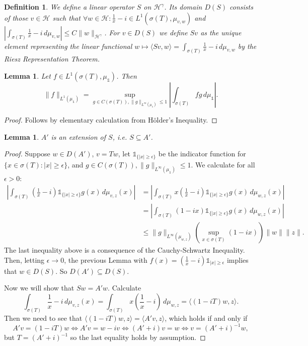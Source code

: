 \documentclass[12pt,oneside]{report}
\newtheorem{lem}[thm]{Lemma}
\newtheorem{defn}[thm]{Definition}
\begin{document}
\begin{defn}
    We define a linear operator $S$ on $\mathscr{H}^{\gamma}$. Its domain $D(S)$ consists of those $v \in \mathscr{H}$ such that $\forall w \in \mathscr{H}: \frac{1}{x} - i \in L^{1}(\sigma(T),\mu_{v,w})$ and $|\int _{\sigma(T)} \frac{1}{x} - i \, d\mu_{v,w}| \leq C\|w\|_{\mathscr{H}^{\gamma}}$. For $v \in D(S)$ we define $Sv$ as the unique element representing the linear functional $w \mapsto \langle Sv, w \rangle = \int _{\sigma(T)} \frac{1}{x} - i \, d\mu_{v,w}$ by the Riesz Representation Theorem.
\end{defn}

\begin{lem}
    Let $f \in L^{1}(\sigma(T), \mu_{\mathds{1}})$. Then
    $$\|f\|_{L^{1}(\mu_{\mathds{1}})} = \sup_{g \in C(\sigma(T)), \|g\|_{L^{\infty}(\mu_{\mathds{1}})}\leq 1} \left|\int _{\sigma(T)} fg \, d\mu_{\mathds{1}}\right|.$$
\end{lem}
\begin{proof}
    Follows by elementary calculation from Hölder's Inequality.
\end{proof}

\begin{lem}
    $A'$ is an extension of $S$, i.e. $S \subseteq A'$.
\end{lem}
\begin{proof}
    Suppose $w \in D(A')$, $v = Tw$, let $\mathds{1}_{\{ |x| \geq \epsilon \}}$ be the indicator function for $\{x \in \sigma(T) : |x| \geq \epsilon\}$, and $g \in C(\sigma(T)), \|g\|_{L^{\infty}(\mu_{\mathds{1}})} \leq 1$. We calculate for all $\epsilon > 0$:
    \begin{align*}
    \left| \int _{\sigma(T)} \left( \frac{1}{x} - i \right) \mathds{1}_{\{ |x| \geq \epsilon \}} g(x) \, d\mu_{v,z}(x) \right| &= \left| \int _{\sigma(T)} x \left( \frac{1}{x} - i \right) \mathds{1}_{\{ |x| \geq \epsilon \}} g(x) \, d\mu_{w,z}(x) \right| \\
    &= \left| \int _{\sigma(T)} ( 1 - ix ) \mathds{1}_{\{ |x| \geq \epsilon \}} g(x) \, d\mu_{w,z}(x) \right| \\
    &\leq \|g\|_{L^{\infty}(\mu_{w,z})} \left(\sup_{x \in \sigma(T)} (1 - ix)\right) \|w\| \|z\|.
    \end{align*}
    The last inequality above is a consequence of the Cauchy-Schwartz Inequality. Then, letting $\epsilon \to 0$, the previous Lemma with $f(x) = \left(\frac{1}{x} - i\right)\mathds{1}_{|x|\geq\epsilon}$ implies that $w \in D(S)$. So $D(A') \subseteq D(S)$.

    Now we will show that $Sw = A'w$. Calculate
    $$\int _{\sigma(T)} \frac{1}{x} - i \, d\mu_{v,z}(x) = \int _{\sigma(T)} x\left( \frac{1}{x} - i \right) \, d\mu_{w,z} = \langle (1 - iT)w, z \rangle.$$
    Then we need to see that $\langle (1 - iT)w, z \rangle = \langle A'v, z \rangle$, which holds if and only if $$A'v = (1 - iT)w \iff A'v = w - iv \iff (A'+i)v = w \iff v = (A'+i)^{-1}w,$$
    but $T = (A' + i)^{-1}$ so the last equality holds by assumption.
\end{proof}
\end{document}
